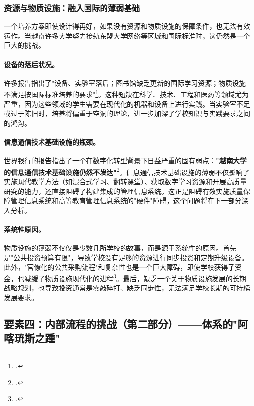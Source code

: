 \subsubsection{资源与物质设施：融入国际的薄弱基础}

一个培养方案即使设计得再好，如果没有资源和物质设施的保障条件，也无法有效运作。当越南许多大学努力接轨东盟大学网络等区域和国际标准时，这仍然是一个巨大的挑战。

\paragraph{设备的落后状况。} 许多报告指出了"设备、实验室落后；图书馆缺乏更新的国际学习资源；物质设施不满足按国际标准培养的要求"\footcite{vjes_challenges_aun_2020}。这种短缺在科学、技术、工程和医药等领域尤为严重，因为这些领域的学生需要在现代化的机器和设备上进行实践。当实验室不足或过于陈旧时，培养将偏重于空洞的理论，进一步加深了学校知识与实践要求之间的鸿沟。

\paragraph{信息通信技术基础设施的瓶颈。} 世界银行的报告指出了一个在数字化转型背景下日益严重的固有弱点：\textbf{"越南大学的信息通信技术基础设施仍然不发达"}\footcite{worldbank_improvingperformance_2020}。信息通信技术基础设施的薄弱不仅影响了实施现代教学方法（如混合式学习、翻转课堂）、获取数字学习资源和开展高质量研究的能力，还直接阻碍了构建集成的管理信息系统。这正是阻碍有效实施质量保障管理信息系统和高等教育管理信息系统的"硬件"障碍，这个问题将在下一部分深入分析。

\paragraph{系统性原因。} 物质设施的薄弱不仅仅是少数几所学校的故事，而是源于系统性的原因。首先是"公共投资预算有限"，导致学校没有足够的资源进行同步投资和定期升级设备。此外，"官僚化的公共采购流程"和复杂性也是一个巨大障碍，即使学校获得了资金，也减缓了物质设施现代化的进程\footcite{vjes_challenges_aun_2020}。最后，缺乏一个关于物质设施发展的长期战略规划，也导致投资通常是零敲碎打、缺乏同步性，无法满足学校长期的可持续发展要求。




\subsection{要素四：内部流程的挑战（第二部分）——体系的"阿喀琉斯之踵"}
\label{subsec:thach_thuc_quytringnoibo_achilles}

